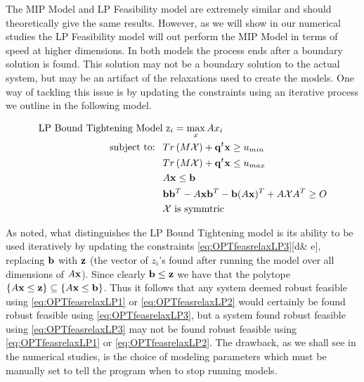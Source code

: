 The MIP Model and LP Feasibility model are extremely similar and should theoretically give the same results. 
However, as we will show in our numerical studies the LP Feasibility model will out perform the MIP Model in terms of speed at higher dimensions. 
In both models the process ends after a boundary solution is found. 
This solution may not be a boundary solution to the actual system, but may be an artifact of the relaxations used to create the models. 
One way of tackling this issue is by updating the constraints using an iterative process we outline in the following model.
 
\begin{subequations}\label{eq:OPTfeasrelaxLP3}
\begin{align}
\text{LP Bound Tightening Model}& \ \mathrm{z}_{i} = \max_x Ax_i  \\
 \text{subject to: } \ &Tr\left(M\mathcal{X}\right)+\bold q^t\bold x \geq u_{min} \\
 & Tr\left(M\mathcal{X}\right)+\bold q^t\bold x \leq u_{max} \\
 	&A\bold x\leq \bold b \\
 	&\bold b\bold b^T-A\bold x\bold b^T-\bold b(A\bold x)^T+A\mathcal{X}A^T\geq O \\
 	&\mathcal{X} \text{ is symmtric}
\end{align}
\end{subequations}

As noted, what distinguishes the LP Bound Tightening model is its ability to be used iteratively by updating the constraints \eqref{eq:OPTfeasrelaxLP3}[d\& e], replacing $\bold b$ with $\bold z$ (the vector of $z_i$'s found after running the model over all dimensions of $A\bold x$). 
Since clearly $\bold b\leq \bold z$ we have that the polytope $\{A\bold x\leq \bold z\}\subseteq\{A\bold x\leq \bold b\}$. 
Thus it follows that any system deemed robust feasible using \eqref{eq:OPTfeasrelaxLP1} or \eqref{eq:OPTfeasrelaxLP2} would certainly be found robust feasible using \eqref{eq:OPTfeasrelaxLP3}, but a system found robust feasible using \eqref{eq:OPTfeasrelaxLP3} may not be found robust feasible using \eqref{eq:OPTfeasrelaxLP1} or \eqref{eq:OPTfeasrelaxLP2}. 
The drawback, as we shall see in the numerical studies, is the choice of modeling parameters which must be manually set to tell the program when to stop running models. 

